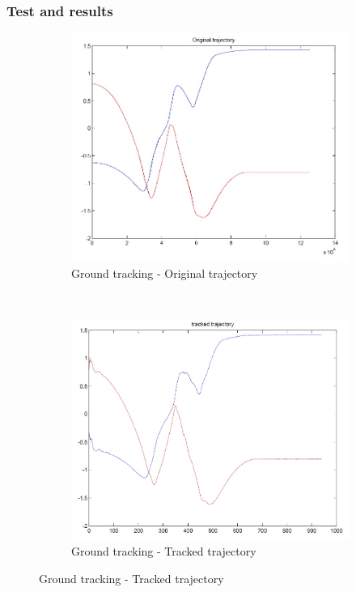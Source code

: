 \subsubsection{Test and results}


\begin{figure}[h]
	\centering
	\begin{subfigure}[b]{0.4\linewidth}
		\centering
		\includegraphics[width=\linewidth]{../Images/c3/sim2_traj_ori}
		\caption{Ground tracking - Original trajectory}
		\label{fig:sim2_traj_ori}
	\end{subfigure}
	~
	\begin{subfigure}[b]{0.4\linewidth}
		\centering
		\includegraphics[width=\linewidth]{../Images/c3/sim2_traj_track}
		\caption{Ground tracking - Tracked trajectory}
		\label{fig:sim2_traj_track}
	\end{subfigure}

\end{figure}


